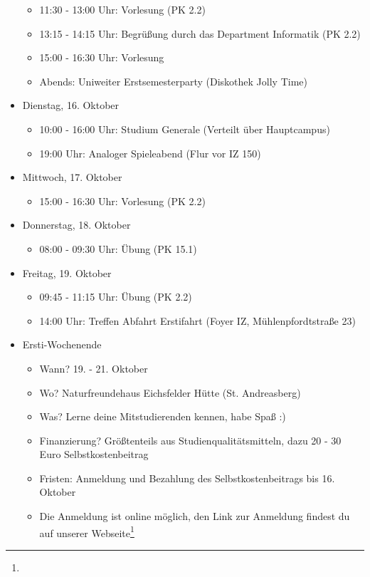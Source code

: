 \begin{itemize}
\begin{itemize}
            \item 11:30 - 13:00 Uhr: Vorlesung  (PK 2.2)
            \item 13:15 - 14:15 Uhr: Begrüßung durch das Department Informatik (PK 2.2)
            \item 15:00 - 16:30 Uhr: Vorlesung 
            \item Abends: Uniweiter Erstsemesterparty (Diskothek Jolly Time)
        \end{itemize}
    \item Dienstag, 16. Oktober
        \begin{itemize}
            \item 10:00 - 16:00 Uhr: Studium Generale (Verteilt über Hauptcampus)
            \item 19:00 Uhr: Analoger Spieleabend (Flur vor IZ 150)
        \end{itemize}
    \item Mittwoch, 17. Oktober
        \begin{itemize}
            \item 15:00 - 16:30 Uhr: Vorlesung  (PK 2.2)
        \end{itemize}
    \item Donnerstag, 18. Oktober
        \begin{itemize}
            \item 08:00 - 09:30 Uhr: Übung  (PK 15.1)
        \end{itemize}
    \item Freitag, 19. Oktober
        \begin{itemize}
            \item 09:45 - 11:15 Uhr: Übung  (PK 2.2)
            \item 14:00 Uhr: Treffen Abfahrt Erstifahrt (Foyer IZ, Mühlenpfordtstraße 23)
        \end{itemize}
    \item Ersti-Wochenende
        \begin{itemize}
            \item Wann? 19. - 21. Oktober
            \item Wo? Naturfreundehaus Eichsfelder Hütte (St. Andreasberg)
            \item Was? Lerne deine Mitstudierenden kennen, habe Spaß :)
            \item Finanzierung? Größtenteils aus Studienqualitätsmitteln, dazu 20 - 30 Euro Selbstkostenbeitrag
            \item Fristen: Anmeldung und Bezahlung des Selbstkostenbeitrags bis 16. Oktober
            \item Die Anmeldung ist online möglich, den Link zur Anmeldung findest du auf unserer Webseite\footnote{}
        \end{itemize}
\end{itemize}
